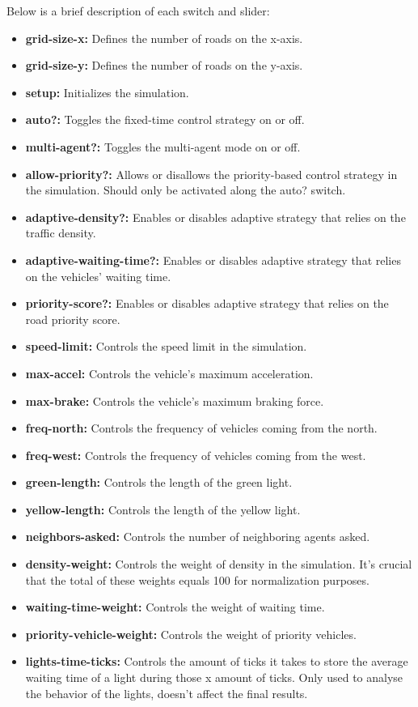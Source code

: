 \documentclass[sigconf]{acmart}
\begin{document}
Below is a brief description of each switch and slider:
\begin{itemize}
    \item \textbf{grid-size-x:} Defines the number of roads on the x-axis.
    \item \textbf{grid-size-y:} Defines the number of roads on the y-axis.
    \item \textbf{setup:} Initializes the simulation.
    \item \textbf{auto?:} Toggles the fixed-time control strategy on or off.
    \item \textbf{multi-agent?:} Toggles the multi-agent mode on or off.
    \item \textbf{allow-priority?:} Allows or disallows the priority-based control strategy in the simulation. Should only be activated along the auto? switch.
    \item \textbf{adaptive-density?:} Enables or disables adaptive strategy that relies on the traffic density.
    \item \textbf{adaptive-waiting-time?:} Enables or disables adaptive strategy that relies on the vehicles’ waiting time.
    \item \textbf{priority-score?:} Enables or disables adaptive strategy that relies on the road priority score.
    \item \textbf{speed-limit:} Controls the speed limit in the simulation.
    \item \textbf{max-accel:} Controls the vehicle’s maximum acceleration.
    \item \textbf{max-brake:} Controls the vehicle’s maximum braking force.
    \item \textbf{freq-north:} Controls the frequency of vehicles coming from the north.
    \item \textbf{freq-west:} Controls the frequency of vehicles coming from the west.
    \item \textbf{green-length:} Controls the length of the green light.
    \item \textbf{yellow-length:} Controls the length of the yellow light.
    \item \textbf{neighbors-asked:} Controls the number of neighboring agents asked.
    \item \textbf{density-weight:} Controls the weight of density in the simulation. It's crucial that the total of these weights equals 100 for normalization purposes.
    \item \textbf{waiting-time-weight:} Controls the weight of waiting time.
    \item \textbf{priority-vehicle-weight:} Controls the weight of priority vehicles.
    \item \textbf{lights-time-ticks:} Controls the amount of ticks it takes to store the average waiting time of a light during those x amount of ticks. Only used to analyse the behavior of the lights, doesn’t affect the final results.
\end{itemize}
\end{document}

